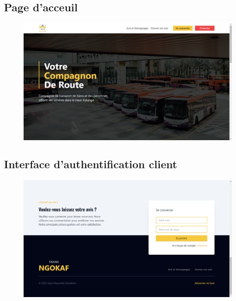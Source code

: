     \subsection[Page d'acceuil]{Page d'acceuil}
    \begin{figure}[H]
        \centering
        \includegraphics[width=130mm]{images/presentation-de-la-solution/home.png}
        \label{fig:mdSysteme}
    \end{figure}    
    \subsection[Interface d’authentification client]{Interface d’authentification client}
        \begin{figure}[H]
            \centering
            \includegraphics[width=130mm]{images/presentation-de-la-solution/connexion.png}
            \label{fig:mdSysteme}
        \end{figure}
